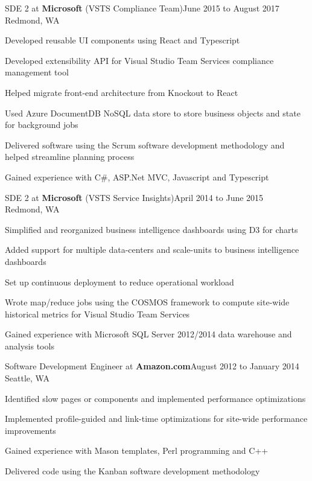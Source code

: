 \documentclass[letterpaper]{article}
\newenvironment{resume-list}
{\begin{itemize}
 \setlength{\itemsep}{0pt}
 \setlength{\parskip}{0pt}}
{\end{itemize}}
\begin{document}
\noindent SDE 2 at {\bfseries Microsoft} (VSTS Compliance Team)\dotfill June 2015 to August 2017\\
Redmond, WA
\begin{resume-list}
\item Developed reusable UI components using React and Typescript
\item Developed extensibility API for Visual Studio Team Services compliance management tool
\item Helped migrate front-end architecture from Knockout to React
\item Used Azure DocumentDB NoSQL data store to store business objects and state for background jobs
\item Delivered software using the Scrum software development methodology and helped streamline planning process
\item Gained experience with C\#, ASP.Net MVC, Javascript and Typescript
\end{resume-list}
\noindent SDE 2 at {\bfseries Microsoft} (VSTS Service Insights)\dotfill April 2014 to June 2015\\
Redmond, WA
\begin{resume-list}
\item Simplified and reorganized business intelligence dashboards using D3 for charts
\item Added support for multiple data-centers and scale-units to business intelligence dashboards
\item Set up continuous deployment to reduce operational workload
\item Wrote map/reduce jobs using the COSMOS framework to compute site-wide historical metrics for Visual Studio Team Services
\item Gained experience with Microsoft SQL Server 2012/2014 data warehouse and analysis tools
\end{resume-list}
\noindent Software Development Engineer at {\bfseries Amazon.com}\dotfill August 2012 to January 2014\\
Seattle, WA
\begin{resume-list}
\item Identified slow pages or components and implemented performance optimizations
\item Implemented profile-guided and link-time optimizations for site-wide performance improvements
\item Gained experience with Mason templates, Perl programming and C++
\item Delivered code using the Kanban software development methodology
\end{resume-list}
\end{document}
